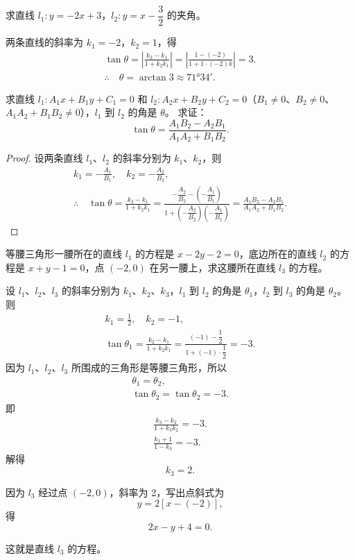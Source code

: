 \begin{example}
  求直线 $l_1:y=-2x+3$，$l_2:y=x-\dfrac{3}{2}$ 的夹角。
\end{example}
\begin{solution}
  两条直线的斜率为 $k_1= -2$，$k_2=1$，得
  \begin{gather*}
  \tan \theta = \left|\frac{k_2-k_1}{1+k_2k_1}\right| =\left|\frac{1-(-2)}{1+1\cdot(-2)k}\right|=3.\\
  \therefore\quad \theta=\arctan3\approx\ang{71;34;}.
  \end{gather*}
\end{solution}
\begin{example}
  求直线 $l_1:A_1x+B_1y+C_1=0$ 和 $l_2:A_2x+B_2y+C_2=0$（$B_1\neq 0$、$B_2\neq 0$、$A_1A_2+B_1B_2\neq 0$），$l_1$ 到 $l_2$ 的角是 $\theta$。
  求证：
  \[ \tan\theta = \frac{A_1B_2-A_2B_1}{A_1A_2+B_1B_2}.\]
\end{example}
\begin{proof}
  设两条直线 $l_1$、$l_2$ 的斜率分别为 $k_1$、$k_2$，则
  \begin{gather*}
    k_1=-\frac{A_1}{B_1},\quad k_2=-\frac{A_2}{B_2},\\
    \therefore\quad \tan\theta=\frac{k_2-k_1}{1+k_2k_1}=\frac{-\dfrac{A_2}{B_2}-\left(-\dfrac{A_1}{B_1}\right)}{1+\left(-\dfrac{A_2}{B_2}\right)\left(-\dfrac{A_1}{B_1}\right)}=\frac{A_1B_2-A_2B_1}{A_1A_2+B_1B_2}.
  \end{gather*}
\end{proof}

\begin{example}
  等腰三角形一腰所在的直线 $l_1$ 的方程是 $x-2y-2=0$，底边所在的直线 $l_2$ 的方程是 $x+y-1=0$，点 $(-2,0)$ 在另一腰上，求这腰所在直线 $l_3$ 的方程。
\end{example}
\begin{solution}
  设 $l_1$、$l_2$、$l_3$ 的斜率分别为 $k_1$、$k_2$、$k_3$，$l_1$ 到 $l_2$ 的角是 $\theta_1$，$l_2$ 到 $l_3$ 的角是 $\theta_2$。则
  \begin{gather*} 
    k_1=\frac{1}{2},\quad k_2=-1,\\
    \tan\theta_1=\frac{k_2-k_1}{1+k_2k_1}=\frac{(-1)-\dfrac{1}{2}}{1+(-1)\cdot\dfrac{1}{2}}=-3.
  \end{gather*}
  因为 $l_1$、$l_2$、$l_3$ 所围成的三角形是等腰三角形，所以
  \begin{gather*} 
    \theta_1=\theta_2,\\
    \tan\theta_2=\tan\theta_2=-3.
  \end{gather*}
  即
  \begin{gather*} 
    \frac{k_3-k_2}{1+k_3k_2}=-3.\\
    \frac{k_3+1}{1-k_3}=-3.
  \end{gather*}
  解得
  \[ k_3=2.\]

  因为 $l_3$ 经过点 $(-2,0)$，斜率为 2，写出点斜式为
  \[ y=2[x-(-2)],\]
  得
  \[ 2x-y+4=0.\]

  这就是直线 $l_3$ 的方程。
\end{solution}

